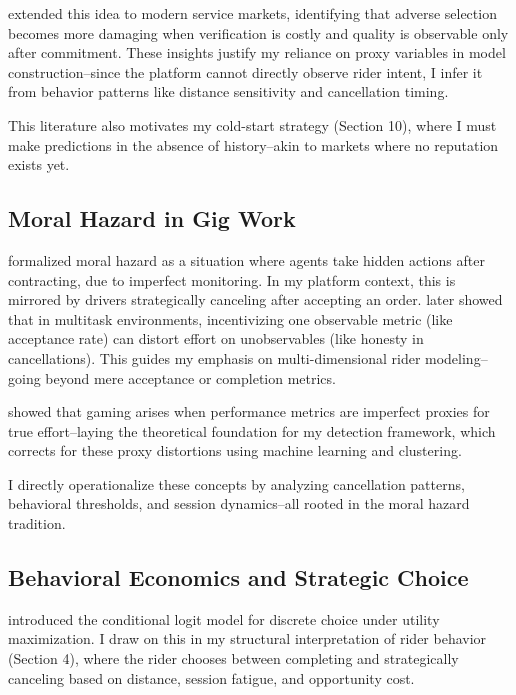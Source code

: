 \documentclass[12pt,letterpaper]{article}
\begin{document}
\citet{dranove2010quality} extended this idea to modern service markets, identifying that adverse selection becomes more damaging when verification is costly and quality is observable only after commitment. These insights justify my reliance on proxy variables in model construction--since the platform cannot directly observe rider intent, I infer it from behavior patterns like distance sensitivity and cancellation timing.

This literature also motivates my cold-start strategy (Section 10), where I must make predictions in the absence of history--akin to markets where no reputation exists yet.

\subsection{Moral Hazard in Gig Work}

\citet{holmstrom1979moral} formalized moral hazard as a situation where agents take hidden actions after contracting, due to imperfect monitoring. In my platform context, this is mirrored by drivers strategically canceling after accepting an order. \citet{holmstrom1991multitask} later showed that in multitask environments, incentivizing one observable metric (like acceptance rate) can distort effort on unobservables (like honesty in cancellations). This guides my emphasis on multi-dimensional rider modeling--going beyond mere acceptance or completion metrics.

\citet{baker1992incentive} showed that gaming arises when performance metrics are imperfect proxies for true effort--laying the theoretical foundation for my detection framework, which corrects for these proxy distortions using machine learning and clustering.

I directly operationalize these concepts by analyzing cancellation patterns, behavioral thresholds, and session dynamics--all rooted in the moral hazard tradition.

\subsection{Behavioral Economics and Strategic Choice}

\citet{mcfadden1974conditional} introduced the conditional logit model for discrete choice under utility maximization. I draw on this in my structural interpretation of rider behavior (Section 4), where the rider chooses between completing and strategically canceling based on distance, session fatigue, and opportunity cost.
\end{document}
